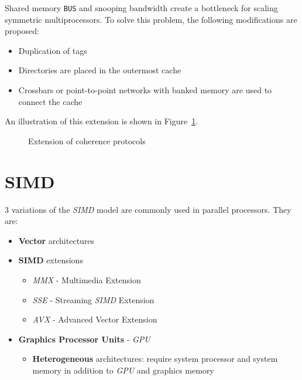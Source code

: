 \documentclass[english]{article}
\begin{document}
Shared memory \texttt{BUS} and snooping bandwidth create a bottleneck for scaling symmetric multiprocessors.
To solve this problem, the following modifications are proposed:

\begin{itemize}
  \item Duplication of tags
  \item Directories are placed in the outermost cache
  \item Crossbars or point-to-point networks with banked memory are used to connect the cache
\end{itemize}

\bigskip
An illustration of this extension is shown in Figure~\ref{fig:MESI-extension}.

\begin{figure}[htbp]
  \bigskip
  \centering
  \caption{Extension of coherence protocols}
  \label{fig:MESI-extension}
  \bigskip
\end{figure}

\clearpage

\section{SIMD}
\label{sec:simd}

\(3\) variations of the \textit{SIMD} model are commonly used in parallel processors.
They are:

\begin{itemize}
  \item \textbf{Vector} architectures
  \item \textbf{SIMD} extensions
        \begin{itemize}
          \item \textit{MMX} - Multimedia Extension
          \item \textit{SSE} - Streaming \textit{SIMD} Extension
          \item \textit{AVX} - Advanced Vector Extension
        \end{itemize}
  \item \textbf{Graphics Processor Units} - \textit{GPU}
        \begin{itemize}
          \item \textbf{Heterogeneous} architectures: require system processor and system memory in addition to \textit{GPU} and graphics memory
        \end{itemize}
\end{itemize}
\end{document}
